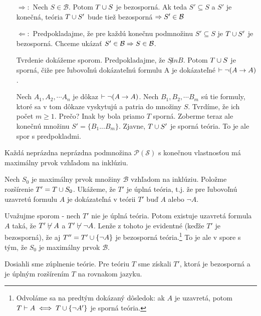\begin{dokaz}
   \begin{itemize}
       \item[$\Rightarrow:$]
            Nech $S \in \mathcal{B}$. Potom $T \cup S$ je bezosporná.
            Ak teda $S' \subseteq S$ a  $S'$ je konečná, teória 
            $T \cup S'$ bude tiež bezosporná $\Rightarrow S' \in \mathcal{B}$
        \item[$\Leftarrow:$]
            Predpokladajme, že pre každú konečnu podmnožinu $S' \subseteq S$
            je $T \cup S'$ je bezosporná.
            Chceme ukázať $S' \in \mathcal{B} \Rightarrow S \in \mathcal{B}$.

            Tvrdenie dokážeme sporom.
            Predpokladajme, že $S \not in B$.
            Potom $T \cup S$ je sporná,
            čiže pre ľubovoľnú dokázateľnú formulu A je dokázateľné
            $\vdash \neg(A \rightarrow A)$.

            Nech $A_1, A_2, \cdots A_n$ je dôkaz $\vdash \neg(A \rightarrow A)$.
            Nech $B_1, B_2, \cdots B_m$ sú tie formuly,
            ktoré sa v tom dôkaze vyskytujú a patria do množiny $S$.
            Tvrdíme, že ich počet $m \ge 1$.
            Prečo? Inak by bola priamo $T$ sporná.
            Zoberme teraz ale konečnú množinu $S'=\{B_1 ... B_m\}$.
            Zjavne, $T \cup S'$ je sporná teória.
            To je ale spor s predpokladmi.
    \end{itemize}

    \begin{lema}
        Každá neprázdna neprázdna podmnožina $\mathcal{P}(\mathscr{S})$ s konečnou vlastnosťou 
        má maximálny prvok vzhľadom na inklúziu.
    \end{lema}

    Nech $S_0$ je maximálny prvok množiny $\mathcal{B}$ vzhľadom na inklúziu.
    Položme rozšírenie $T' = T \cup S_0$. Ukážeme, že $T'$ je úplná
    teória, t.j. že pre ľubovoľnú uzavretú formulu $A$ je dokázateľná
    v teórii $T'$ buď $A$ alebo $\neg A$.

    Uvažujme sporom - nech $T'$ nie je úplná teória. 
    Potom existuje uzavretá formula $A$ taká,
    že $T'\not \vdash A$ a $T' \not \vdash \neg A$.
    Lenže z tohoto je evidentné (keďže $T'$ je bezosporná), že aj
    $T'' = T' \cup \{\neg A\}$ je bezosporná teória.\footnote{
        Odvoláme sa na predtým dokázaný dôsledok: ak $A$ je uzavretá,
        potom $T \vdash A \iff T \cup \{\neg A'\}$ je sporná teória.
    }
    To je ale v spore s tým, že $S_0$ je maximálny prvok $\mathcal{B}$.

    Dosiahli sme zúplnenie teórie. Pre teóriu $T$ sme získali $T'$,
    ktorá je bezosporná a je úplným rozšírením $T$ na rovnakom jazyku.
\end{dokaz}

